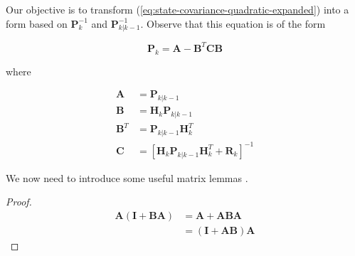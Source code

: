 Our objective is to transform (\ref{eq:state-covariance-quadratic-expanded}) into a form
based on $\mathbf{P}_k^{-1}$ and $\mathbf{P}_{k|k-1}^{-1}$. Observe that this equation is of the form

\begin{equation}
    \mathbf{P}_k = \mathbf{A} - \mathbf{B}^T \mathbf{C} \mathbf{B}
    \label{eq:state-covariance-quadratic-form}
\end{equation}

where

\begin{equation*}
    \begin{aligned}
        \mathbf{A} &= \mathbf{P}_{k|k-1} \\
        \mathbf{B} &= \mathbf{H}_k \mathbf{P}_{k|k-1} \\
        \mathbf{B}^T & = \mathbf{P}_{k|k-1} \mathbf{H}_k^T \\
        \mathbf{C} &= \left[ \mathbf{H}_k \mathbf{P}_{k|k-1} \mathbf{H}_k^T + \mathbf{R}_k \right]^{-1}
    \end{aligned}
\end{equation*}

We now need to introduce some useful matrix lemmas \cite{brookes2020}.


\begin{proof}
\begin{equation*}
    \begin{aligned}
        \mathbf{A} \left( \mathbf{I} + \mathbf{B} \mathbf{A} \right) &= \mathbf{A} + \mathbf{A} \mathbf{B} \mathbf{A} \\
        &= \left( \mathbf{I} + \mathbf{A} \mathbf{B} \right) \mathbf{A}
    \end{aligned}
\end{equation*}
\end{proof}


